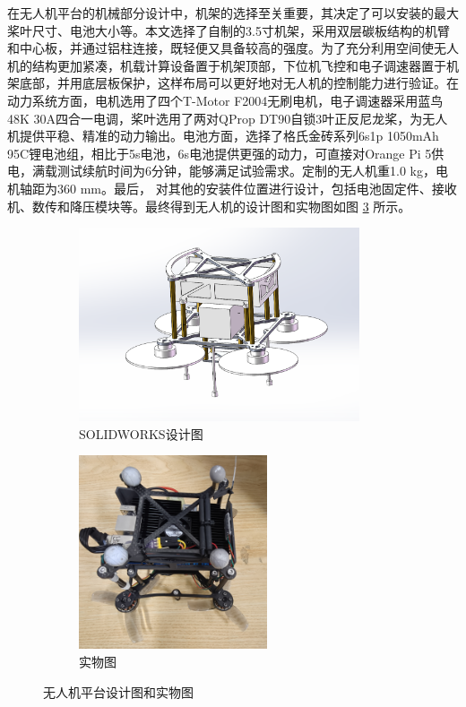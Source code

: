 \documentclass[lang=chs, degree=master, blindreview=false, winfonts=true]{yanputhesis}
\begin{document}
在无人机平台的机械部分设计中，机架的选择至关重要，其决定了可以安装的最大桨叶尺寸、电池大小等。本文选择了自制的3.5寸机架，采用双层碳板结构的机臂和中心板，并通过铝柱连接，既轻便又具备较高的强度。为了充分利用空间使无人机的结构更加紧凑，机载计算设备置于机架顶部，下位机飞控和电子调速器置于机架底部，并用底层板保护，这样布局可以更好地对无人机的控制能力进行验证。在动力系统方面，电机选用了四个T-Motor F2004无刷电机，电子调速器采用蓝鸟48K 30A四合一电调，桨叶选用了两对QProp DT90自锁3叶正反尼龙桨，为无人机提供平稳、精准的动力输出。电池方面，选择了格氏金砖系列6s1p 1050mAh 95C锂电池组，相比于5s电池，6s电池提供更强的动力，可直接对Orange Pi 5供电，满载测试续航时间为6分钟，能够满足试验需求。定制的无人机重1.0 kg，电机轴距为360 mm。最后， 对其他的安装件位置进行设计，包括电池固定件、接收机、数传和降压模块等。最终得到无人机的设计图和实物图如图 \ref{Fig.proximity} 所示。
\begin{figure}[htb!]
	\centering
	\begin{minipage}[t]{0.96\textwidth}
		\centering
		\begin{subfigure}[t]{0.47\textwidth}
			\centering
			\includegraphics[height = 2.25in]{picture/5_7.jpg}
			\caption{SOLIDWORKS设计图\label{fig.path}}
		\end{subfigure}\hfill
		\begin{subfigure}[t]{0.47\textwidth}
			\centering
			\includegraphics[height = 2.25in]{picture/5_8.jpg}
			\caption{实物图\label{fig.proximity}}
		\end{subfigure}
	\end{minipage}
	\caption{无人机平台设计图和实物图\label{Fig.proximity}}
\end{figure}
\end{document}
